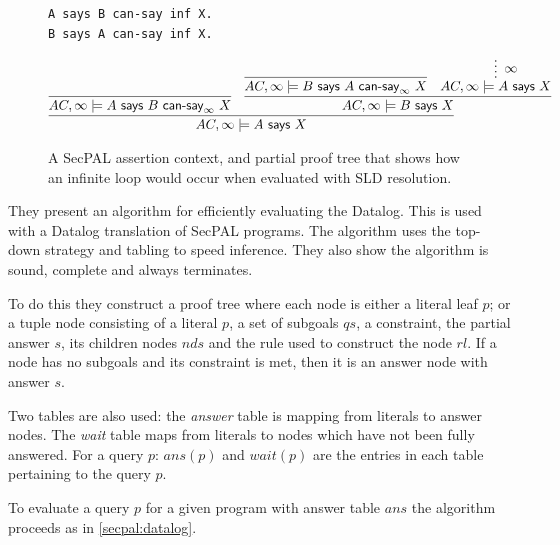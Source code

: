 \documentclass[a4paper,sfsidenotes]{%
  scrartcl%
}
\begin{document}
\begin{figure}\centering
  \begin{lstlisting}[language=SecPAL]
A says B can-say inf X.
B says A can-say inf X.
  \end{lstlisting}
  \begin{align*}
    \infer{ AC,\infty \models A\textsf{~says~}X }{%
    \infer{AC,\infty \models A \textsf{~says~} B \textsf{~can-say}_\infty~X}{} &
    \infer{AC,\infty \models B \textsf{~says~} X}{%
      \infer{AC,\infty \models B \textsf{~says~} A \textsf{~can-say}_\infty~X}{} &
    \infer*[\infty]{AC,\infty \models A \textsf{~says~} X}{}
      }
    }
  \end{align*}
  \caption[SecPAL proof.]{A SecPAL assertion context, and partial proof tree that shows how an
    infinite loop would occur when evaluated with \ac{SLD} resolution.}
  \label{secpal:inf}
\end{figure}

They present an algorithm for efficiently evaluating the Datalog. This is used
with a Datalog translation of
SecPAL programs.  The algorithm uses the top-down strategy and tabling to speed
inference. They also show the algorithm is sound, complete and always
terminates. 

To do this they construct a proof tree where each node is either a literal leaf
$p$; or a tuple node consisting of a literal $p$, a set of subgoals $qs$, a
constraint, the partial answer $s$, its children nodes $nds$ and the rule used
to construct the node $rl$.  If a node has no subgoals and its constraint
is met, then it is an answer node with answer $s$.

Two tables are also used: the \emph{answer} table is mapping from literals to
answer nodes.  The \emph{wait} table maps from literals to nodes which
have not been fully answered.  For a query $p$: $ans(p)$ and $wait(p)$ are the
entries in each table pertaining to the query $p$.

To evaluate a query $p$ for a given program with answer table $ans$ the
algorithm proceeds as in \autoref{secpal:datalog}.
\end{document}
